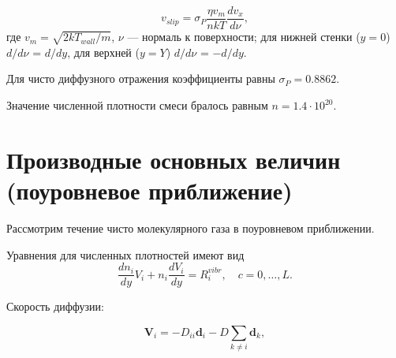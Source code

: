 \documentclass[12pt]{article}
\begin{document}
\begin{equation}
  v_{slip} = \sigma_{P} \frac{\eta v_{m}}{nkT}\frac{d v_{x}}{d \nu},
\end{equation}
где $v_{m} = \sqrt{2kT_{wall} / m}$, $\nu$ --- нормаль к поверхности; для нижней стенки ($y=0$) $d / d \nu$ = $d / d y$, для верхней ($y=Y$) $d / d \nu$ = $-d / d y$.

Для чисто диффузного отражения коэффициенты равны $\sigma_{P} = 0.8862$.

Значение численной плотности смеси бралось равным $n=1.4 \cdot 10^{20}$.



\section{Производные основных величин (поуровневое приближение)}
Рассмотрим течение чисто молекулярного газа в поуровневом приближении.

Уравнения для численных плотностей имеют вид
\begin{equation}
  \frac{d n_{i}}{d y} V_{i} + n_{i}\frac{d V_{i}}{d y} = R_{i}^{vibr},\quad c=0,\ldots,L.\label{densityeqn-sts}
\end{equation}

Скорость диффузии:

\begin{equation}
   \mathbf{V}_{i} = -D_{ii}\mathbf{d}_{i} -D \sum_{k \neq i}\mathbf{d}_{k},
\end{equation}
\end{document}
